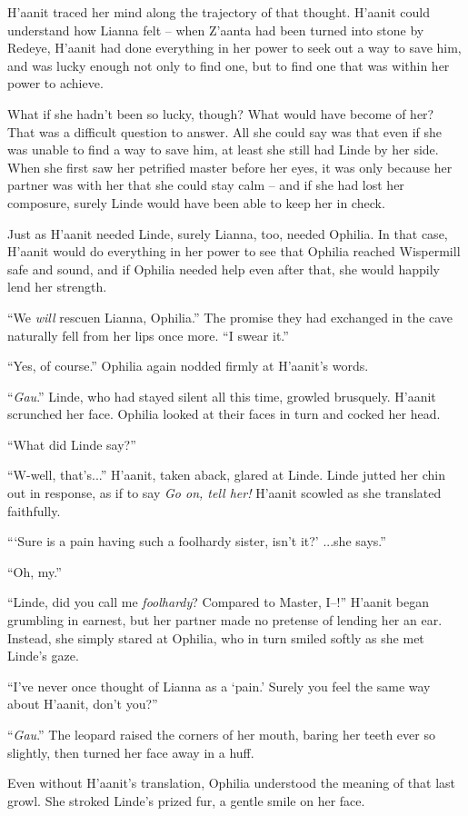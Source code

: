 H'aanit traced her mind along the trajectory of that thought. H'aanit could understand how Lianna felt -- when Z'aanta had been turned into stone by Redeye, H'aanit had done everything in her power to seek out a way to save him, and was lucky enough not only to find one, but to find one that was within her power to achieve.

What if she hadn't been so lucky, though? What would have become of her? That was a difficult question to answer. All she could say was that even if she was unable to find a way to save him, at least she still had Linde by her side. When she first saw her petrified master before her eyes, it was only because her partner was with her that she could stay calm -- and if she had lost her composure, surely Linde would have been able to keep her in check.

Just as H'aanit needed Linde, surely Lianna, too, needed Ophilia. In that case, H'aanit would do everything in her power to see that Ophilia reached Wispermill safe and sound, and if Ophilia needed help even after that, she would happily lend her strength.

``We \emph{will} rescuen Lianna, Ophilia.'' The promise they had exchanged in the cave naturally fell from her lips once more. ``I swear it.''

``Yes, of course.'' Ophilia again nodded firmly at H'aanit's words.

``\emph{Gau}.'' Linde, who had stayed silent all this time, growled brusquely. H'aanit scrunched her face. Ophilia looked at their faces in turn and cocked her head.

``What did Linde say?''

``W-well, that's...'' H'aanit, taken aback, glared at Linde. Linde jutted her chin out in response, as if to say \emph{Go on, tell her!} H'aanit scowled as she translated faithfully.

```Sure is a pain having such a foolhardy sister, isn't it?' ...she says.''

``Oh, my.''

``Linde, did you call me \emph{foolhardy}? Compared to Master, I--!'' H'aanit began grumbling in earnest, but her partner made no pretense of lending her an ear. Instead, she simply stared at Ophilia, who in turn smiled softly as she met Linde's gaze.

``I've never once thought of Lianna as a `pain.' Surely you feel the same way about H'aanit, don't you?''

``\emph{Gau}.'' The leopard raised the corners of her mouth, baring her teeth ever so slightly, then turned her face away in a huff. 

Even without H'aanit's translation, Ophilia understood the meaning of that last growl. She stroked Linde's prized fur, a gentle smile on her face.
\printendnotes